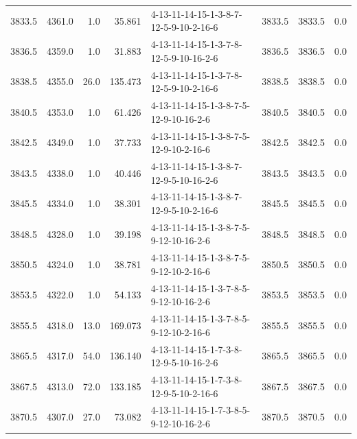 \begin{tabular}{rrrrlrrr}
 3833.5 &  4361.0 &            1.0 &             35.861 &  4-13-11-14-15-1-3-8-7-12-5-9-10-2-16-6 &        3833.5 &          3833.5 &       0.0 \\
 3836.5 &  4359.0 &            1.0 &             31.883 &  4-13-11-14-15-1-3-7-8-12-5-9-10-16-2-6 &        3836.5 &          3836.5 &       0.0 \\
 3838.5 &  4355.0 &           26.0 &            135.473 &  4-13-11-14-15-1-3-7-8-12-5-9-10-2-16-6 &        3838.5 &          3838.5 &       0.0 \\
 3840.5 &  4353.0 &            1.0 &             61.426 &  4-13-11-14-15-1-3-8-7-5-12-9-10-16-2-6 &        3840.5 &          3840.5 &       0.0 \\
 3842.5 &  4349.0 &            1.0 &             37.733 &  4-13-11-14-15-1-3-8-7-5-12-9-10-2-16-6 &        3842.5 &          3842.5 &       0.0 \\
 3843.5 &  4338.0 &            1.0 &             40.446 &  4-13-11-14-15-1-3-8-7-12-9-5-10-16-2-6 &        3843.5 &          3843.5 &       0.0 \\
 3845.5 &  4334.0 &            1.0 &             38.301 &  4-13-11-14-15-1-3-8-7-12-9-5-10-2-16-6 &        3845.5 &          3845.5 &       0.0 \\
 3848.5 &  4328.0 &            1.0 &             39.198 &  4-13-11-14-15-1-3-8-7-5-9-12-10-16-2-6 &        3848.5 &          3848.5 &       0.0 \\
 3850.5 &  4324.0 &            1.0 &             38.781 &  4-13-11-14-15-1-3-8-7-5-9-12-10-2-16-6 &        3850.5 &          3850.5 &       0.0 \\
 3853.5 &  4322.0 &            1.0 &             54.133 &  4-13-11-14-15-1-3-7-8-5-9-12-10-16-2-6 &        3853.5 &          3853.5 &       0.0 \\
 3855.5 &  4318.0 &           13.0 &            169.073 &  4-13-11-14-15-1-3-7-8-5-9-12-10-2-16-6 &        3855.5 &          3855.5 &       0.0 \\
 3865.5 &  4317.0 &           54.0 &            136.140 &  4-13-11-14-15-1-7-3-8-12-9-5-10-16-2-6 &        3865.5 &          3865.5 &       0.0 \\
 3867.5 &  4313.0 &           72.0 &            133.185 &  4-13-11-14-15-1-7-3-8-12-9-5-10-2-16-6 &        3867.5 &          3867.5 &       0.0 \\
 3870.5 &  4307.0 &           27.0 &             73.082 &  4-13-11-14-15-1-7-3-8-5-9-12-10-16-2-6 &        3870.5 &          3870.5 &       0.0 \\

\end{tabular}
